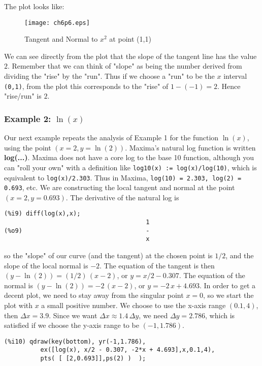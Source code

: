 \documentclass[12pt]{article}
\begin{document}
The plot looks like:

\smallskip
\begin{figure} [h]
   \centerline{\texttt{[image: ch6p6.eps]} }
	\caption{ Tangent and Normal to $x^2$ at point (1,1)  }
\end{figure}                 

\smallskip

We can see directly from the plot that the slope of the tangent line has the value $2$.
Remember that we can think of "slope" as being the number derived from dividing the "rise"
  by the "run".
Thus if we choose a "run" to be the $x$ interval \verb|(0,1)|, from the plot this
  corresponds to the "rise" of $1 - (-1) = 2$.
Hence "rise/run" is $2$.

\smallskip


\subsubsection{Example 2: $\ln(x)$}
Our next example repeats the analysis of Example 1 for the function $\ln(x)$, 
  using the point $(x = 2, y = \ln(2) )$.
Maxima's natural log function is written \textbf{log(...)}.
Maxima does not have a core log to the base 10 function, although you can 
  "roll your own" with a definition like \verb|log10(x) := log(x)/log(10)|,
  which is equivalent to \verb|log(x)/2.303|.
Thus in Maxima, \verb|log(10) = 2.303, log(2) = 0.693|, etc.
We are constructing the local tangent and normal at the point
  $(x = 2, y = 0.693)$.
The derivative of the natural log is
\small
\begin{verbatim}
(%i9) diff(log(x),x);
                                       1
(%o9)                                  -
                                       x
\end{verbatim}
\normalsize
so the "slope" of our curve (and the tangent) at the chosen point is $1/2$, 
  and the slope of the local normal is $-2$.
The equation of the tangent is then $(y - \ln(2) ) = (1/2) \, (x - 2)$, or
  $y = x/2 - 0.307$.
The equation of the normal is $(y - \ln(2) ) = -2 \,(x - 2)$, or
  $y = -2\,x + 4.693$.
%
In order to get a decent plot, we need to stay away from the singular point $x=0$, 
  so we start the plot with $x$ a small positive number. 
We choose to use the x-axis range $(0.1, 4)$, then $\Delta x = 3.9$.
Since we want $\Delta x \approx 1.4 \, \Delta y$, we need $\Delta y = 2.786$,
  which is satisfied if we choose the y-axis range to be $(-1, 1.786)$.
\small
\begin{verbatim}
(%i10) qdraw(key(bottom), yr(-1,1.786),
          ex([log(x), x/2 - 0.307, -2*x + 4.693],x,0.1,4),
          pts( [ [2,0.693]],ps(2) )  );
\end{verbatim}
\normalsize
\end{document}

